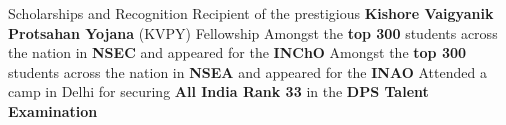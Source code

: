 \begin{rubric}{Scholarships and Recognition}
	\entry*[2017] Recipient of the prestigious \textbf{Kishore Vaigyanik Protsahan Yojana} (KVPY) Fellowship
	\entry*[2019] Amongst the {\bf top 300} students across the nation in {\bf NSEC} and appeared for the {\bf INChO}
	\entry*[2019\phantom{}] Amongst the {\bf top 300} students across the nation in {\bf NSEA} and appeared for the {\bf INAO}
	\entry*[2016] Attended a camp in Delhi for securing \textbf{All India Rank 33} in the \textbf{DPS Talent Examination}
\end{rubric}